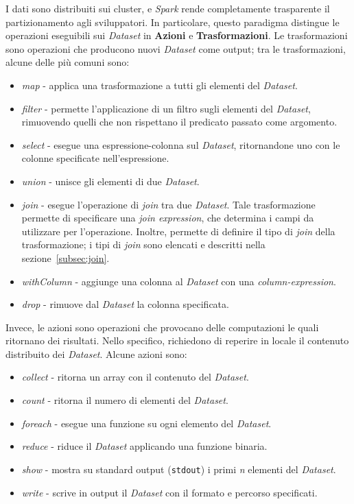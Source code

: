 I dati sono distribuiti sui cluster, e \textit{Spark} rende completamente trasparente il partizionamento agli sviluppatori.
In particolare, questo paradigma distingue le operazioni eseguibili sui \textit{Dataset} in \textbf{Azioni} e \textbf{Trasformazioni}.
Le trasformazioni sono operazioni che producono nuovi \textit{Dataset} come output;
tra le trasformazioni, alcune delle più comuni sono:
\begin{itemize}
    \item \textit{map} - applica una trasformazione a tutti gli elementi del \textit{Dataset}.
    \item \textit{filter} - permette l'applicazione di un filtro sugli elementi del \textit{Dataset}, rimuovendo quelli che non rispettano il predicato passato come argomento.
    \item \textit{select} - esegue una espressione-colonna sul \textit{Dataset}, ritornandone uno con le colonne specificate nell'espressione.
    \item \textit{union} - unisce gli elementi di due \textit{Dataset}.
    \item \textit{join} - esegue l'operazione di \textit{join} tra due \textit{Dataset}.
    Tale trasformazione permette di specificare una \textit{join expression}, che determina i campi da utilizzare per l'operazione.
    Inoltre, permette di definire il tipo di \textit{join} della trasformazione;
    i tipi di \textit{join} sono elencati e descritti nella sezione~\ref{subsec:join}.
    \item \textit{withColumn} - aggiunge una colonna al \textit{Dataset} con una \textit{column-expression}.
    \item \textit{drop} - rimuove dal \textit{Dataset} la colonna specificata.
\end{itemize}
Invece, le azioni sono operazioni che provocano delle computazioni le quali ritornano dei risultati.
Nello specifico, richiedono di reperire in locale il contenuto distribuito dei \textit{Dataset}.
Alcune azioni sono:
\begin{itemize}
    \item \textit{collect} - ritorna un array con il contenuto del \textit{Dataset}.
    \item \textit{count} - ritorna il numero di elementi del \textit{Dataset}.
    \item \textit{foreach} - esegue una funzione su ogni elemento del \textit{Dataset}.
    \item \textit{reduce} - riduce il \textit{Dataset} applicando una funzione binaria.
    \item \textit{show} - mostra su standard output (\texttt{stdout}) i primi \textit{n} elementi del \textit{Dataset}.
    \item \textit{write} - scrive in output il \textit{Dataset} con il formato e percorso specificati.
\end{itemize}
